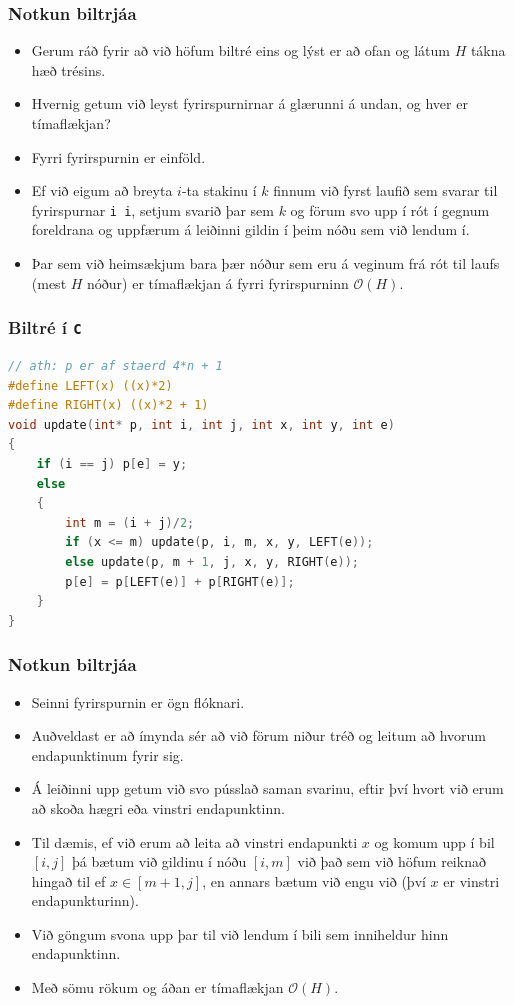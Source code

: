 \documentclass[handout]{beamer}
\begin{document}
\begin{frame}
\frametitle{Notkun biltrjáa}
\begin{itemize}
\item<1-> Gerum ráð fyrir að við höfum biltré eins og lýst er að ofan og látum $H$ tákna hæð trésins.
\item<2-> Hvernig getum við leyst fyrirspurnirnar á glærunni á undan, og hver er tímaflækjan?
\item<3-> Fyrri fyrirspurnin er einföld.
\item<4-> Ef við eigum að breyta $i$-ta stakinu í $k$ finnum við fyrst laufið sem svarar til fyrirspurnar \texttt{i i},
	setjum svarið þar sem $k$ og förum svo upp í rót í gegnum foreldrana og uppfærum á leiðinni gildin í þeim nóðu sem við lendum í.
\item<5-> Þar sem við heimsækjum bara þær nóður sem eru á veginum frá rót til laufs (mest $H$ nóður) er tímaflækjan á fyrri fyrirspurninn $\mathcal{O}(H)$.
\end{itemize}
\end{frame}

\begin{frame}[fragile]
	\frametitle{Biltré í \texttt{C}}
	\tiny
	\begin{lstlisting}[language=C]
// ath: p er af staerd 4*n + 1
#define LEFT(x) ((x)*2)
#define RIGHT(x) ((x)*2 + 1)
void update(int* p, int i, int j, int x, int y, int e)
{
	if (i == j) p[e] = y;
	else
	{
		int m = (i + j)/2;
		if (x <= m) update(p, i, m, x, y, LEFT(e));
		else update(p, m + 1, j, x, y, RIGHT(e));
		p[e] = p[LEFT(e)] + p[RIGHT(e)];
	}
}
\end{lstlisting}
\end{frame}

\begin{frame}
\frametitle{Notkun biltrjáa}
\begin{itemize}
\item<1-> Seinni fyrirspurnin er ögn flóknari.
\item<2-> Auðveldast er að ímynda sér að við förum niður tréð og leitum að hvorum endapunktinum fyrir sig.
\item<3-> Á leiðinni upp getum við svo pússlað saman svarinu, eftir því hvort við erum að skoða hægri eða vinstri endapunktinn.
\item<4-> Til dæmis, ef við erum að leita að vinstri endapunkti $x$ og komum upp í bil $[i, j]$ þá bætum við gildinu í nóðu
$[i, m]$ við það sem við höfum reiknað hingað til ef $x \in [m + 1, j]$, en annars bætum við engu við (því $x$ er vinstri endapunkturinn).
\item<5-> Við göngum svona upp þar til við lendum í bili sem inniheldur hinn endapunktinn.
\item<6-> Með sömu rökum og áðan er tímaflækjan $\mathcal{O}(H)$.
\end{itemize}
\end{frame}
\end{document}

